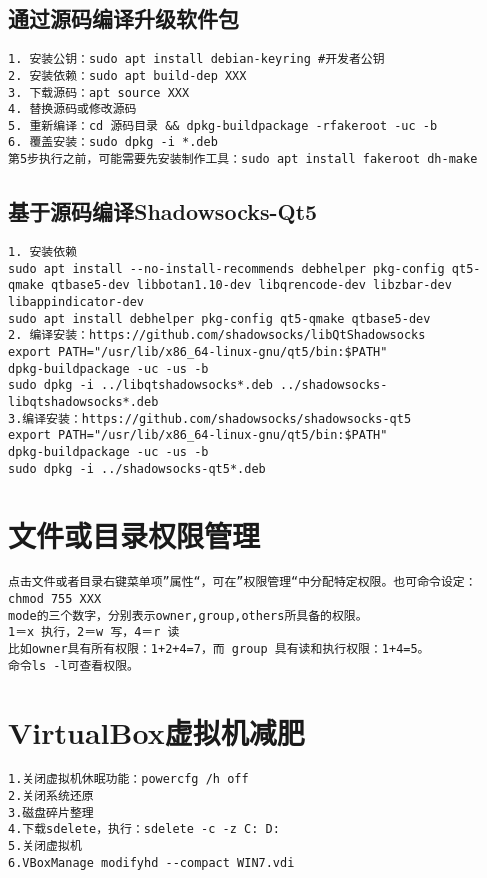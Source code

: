 \documentclass[a4paper,fontset=fandol,zihao=-4,linespread=1.2,oneside]{ctexbook}
\begin{document}
\subsection{通过源码编译升级软件包}
\begin{lstlisting}
1. 安装公钥：sudo apt install debian-keyring #开发者公钥
2. 安装依赖：sudo apt build-dep XXX
3. 下载源码：apt source XXX
4. 替换源码或修改源码
5. 重新编译：cd 源码目录 && dpkg-buildpackage -rfakeroot -uc -b
6. 覆盖安装：sudo dpkg -i *.deb
第5步执行之前，可能需要先安装制作工具：sudo apt install fakeroot dh-make
\end{lstlisting}

\subsection{基于源码编译Shadowsocks-Qt5}
\begin{lstlisting}
1. 安装依赖
sudo apt install --no-install-recommends debhelper pkg-config qt5-qmake qtbase5-dev libbotan1.10-dev libqrencode-dev libzbar-dev libappindicator-dev
sudo apt install debhelper pkg-config qt5-qmake qtbase5-dev
2. 编译安装：https://github.com/shadowsocks/libQtShadowsocks
export PATH="/usr/lib/x86_64-linux-gnu/qt5/bin:$PATH"
dpkg-buildpackage -uc -us -b
sudo dpkg -i ../libqtshadowsocks*.deb ../shadowsocks-libqtshadowsocks*.deb
3.编译安装：https://github.com/shadowsocks/shadowsocks-qt5
export PATH="/usr/lib/x86_64-linux-gnu/qt5/bin:$PATH"
dpkg-buildpackage -uc -us -b
sudo dpkg -i ../shadowsocks-qt5*.deb
\end{lstlisting}

\section{文件或目录权限管理}
\begin{lstlisting}
点击文件或者目录右键菜单项”属性“，可在”权限管理“中分配特定权限。也可命令设定：
chmod 755 XXX
mode的三个数字，分别表示owner,group,others所具备的权限。
1＝x 执行，2＝w 写，4＝r 读
比如owner具有所有权限：1+2+4=7，而 group 具有读和执行权限：1+4=5。
命令ls -l可查看权限。
\end{lstlisting}

\section{VirtualBox虚拟机减肥}
\begin{lstlisting}
1.关闭虚拟机休眠功能：powercfg /h off
2.关闭系统还原
3.磁盘碎片整理
4.下载sdelete，执行：sdelete -c -z C: D:
5.关闭虚拟机
6.VBoxManage modifyhd --compact WIN7.vdi
\end{lstlisting}
\end{document}
